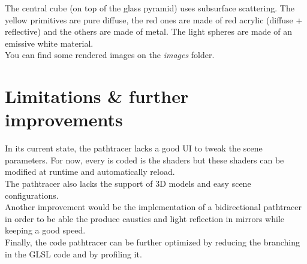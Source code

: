 \documentclass[a4paper,10pt]{article}
\begin{document}
\noindent
The central cube (on top of the glass pyramid) uses subsurface scattering. The yellow primitives are pure diffuse, the red ones are made of red acrylic (diffuse + reflective) and the others are made of metal. The light spheres are made of an emissive white material. \\

\noindent
You can find some rendered images on the \textit{images} folder.

\section{Limitations \& further improvements}

In its current state, the pathtracer lacks a good UI to tweak the scene parameters. For now, every is coded is the shaders but these shaders can be modified at runtime and automatically reload. \\
The pathtracer also lacks the support of 3D models and easy scene configurations.\\
Another improvement would be the implementation of a bidirectional pathtracer in order to be able the produce caustics and light reflection in mirrors while keeping a good speed. \\
Finally, the code pathtracer can be further optimized by reducing the branching in the GLSL code and by profiling it.
\end{document}
